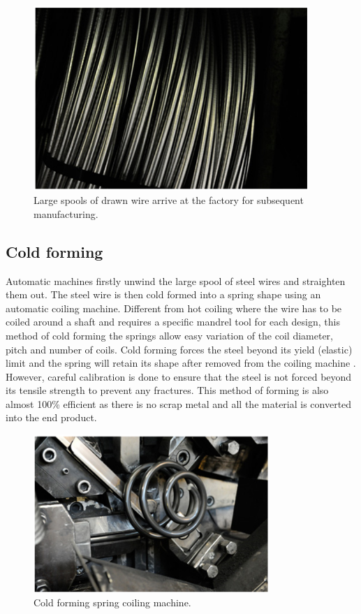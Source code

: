 \documentclass[11pt]{article}
\begin{document}
\begin{figure}[H]
    \centering
    \includegraphics[height = 7cm]{./img/spools1.png}
    \caption{Large spools of drawn wire arrive at the factory for subsequent manufacturing.}
    \label{fig:spools1}
\end{figure}
\subsection{Cold forming}
Automatic machines firstly unwind the large spool of steel wires and straighten them out. The steel wire is then cold formed into a spring shape using an automatic coiling machine. Different from hot coiling where the wire has to be coiled around a shaft and requires a specific mandrel tool for each design, this method of cold forming the springs allow easy variation of the coil diameter, pitch and number of coils. Cold forming forces the steel beyond its yield (elastic) limit and the spring will retain its shape after removed from the coiling machine \cite{b5}. However, careful calibration is done to ensure that the steel is not forced beyond its tensile strength to prevent any fractures. This method of forming is also almost 100\% efficient as there is no scrap metal and all the material is converted into the end product.
\begin{figure}[H]
    \centering
    \includegraphics[height = 6cm]{./img/forming1.png}
    \caption{Cold forming spring coiling machine.}
    \label{fig:forming1}
\end{figure}
\end{document}
